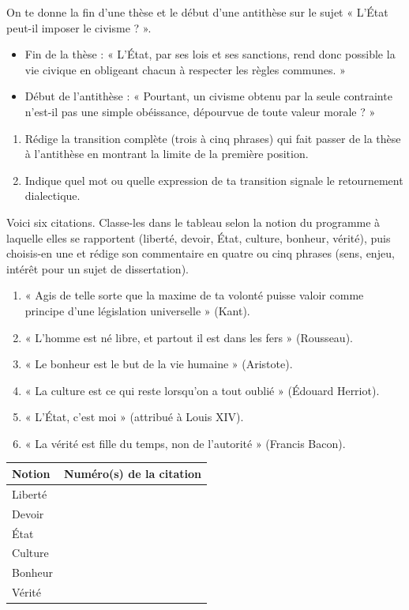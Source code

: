\documentclass[11pt]{article}
\begin{document}
\begin{exercice}
On te donne la fin d'une thèse et le début d'une antithèse sur le sujet « L'État peut-il imposer le civisme ? ».
\begin{itemize}
\item Fin de la thèse : « L'État, par ses lois et ses sanctions, rend donc possible la vie civique en obligeant chacun à respecter les règles communes. »
\item Début de l'antithèse : « Pourtant, un civisme obtenu par la seule contrainte n'est-il pas une simple obéissance, dépourvue de toute valeur morale ? »
\end{itemize}
\begin{enumerate}
\item Rédige la transition complète (trois à cinq phrases) qui fait passer de la thèse à l'antithèse en montrant la limite de la première position.
\item Indique quel mot ou quelle expression de ta transition signale le retournement dialectique.
\end{enumerate}
\end{exercice}

\begin{exercice}
Voici six citations. Classe-les dans le tableau selon la notion du programme à laquelle elles se rapportent (liberté, devoir, État, culture, bonheur, vérité), puis choisis-en une et rédige son commentaire en quatre ou cinq phrases (sens, enjeu, intérêt pour un sujet de dissertation).
\begin{enumerate}
\item « Agis de telle sorte que la maxime de ta volonté puisse valoir comme principe d'une législation universelle » (Kant).
\item « L'homme est né libre, et partout il est dans les fers » (Rousseau).
\item « Le bonheur est le but de la vie humaine » (Aristote).
\item « La culture est ce qui reste lorsqu'on a tout oublié » (Édouard Herriot).
\item « L'État, c'est moi » (attribué à Louis XIV).
\item « La vérité est fille du temps, non de l'autorité » (Francis Bacon).
\end{enumerate}
\begin{center}
\begin{tabularx}{\linewidth}{|l|X|}\hline
\rowcolor{popblueL} \textbf{Notion} & \textbf{Numéro(s) de la citation} \\ \hline
Liberté & \\ \hline
Devoir & \\ \hline
État & \\ \hline
Culture & \\ \hline
Bonheur & \\ \hline
Vérité & \\ \hline
\end{tabularx}
\end{center}
\end{exercice}
\end{document}
